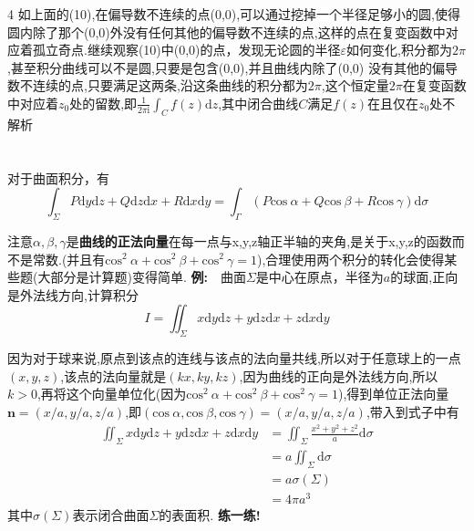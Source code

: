 \documentclass{ctexart}
\begin{document}
\textcircled{\footnotesize{4}} 如上面的(10),在偏导数不连续的点(0,0),可以通过挖掉一个半径足够小的圆,使得圆内除了那个(0,0)外没有任何其他的偏导数不连续的点,这样的点在复变函数中对应着孤立奇点.继续观察(10)中(0,0)的点，发现无论圆的半径$\varepsilon$如何变化,积分都为$2\pi$,甚至积分曲线可以不是圆,只要是包含(0,0),并且曲线内除了(0,0) 没有其他的偏导数不连续的点,只要满足这两条,沿这条曲线的积分都为$2\pi$,这个恒定量$2\pi$在复变函数中对应着$z_{0}$处的留数,即$\frac{1}{2\pi\mathrm{i}}\int_{C}f(z)\mathrm{d}z$,其中闭合曲线$C$满足$f(z)$在且仅在$z_{0}$处不解析

\section{}
对于曲面积分，有$$\int_{\Sigma}P\mathrm{d}y\mathrm{d}z+Q\mathrm{d}z\mathrm{d}x+R\mathrm{d}x\mathrm{d}y=\int_{\Gamma}(P\mathrm{cos}\ \alpha+Q\mathrm{cos}\ \beta+R\mathrm{cos}\ \gamma)\mathrm{d}\sigma$$

注意$\alpha,\beta,\gamma$是\textbf{曲线的正法向量}在每一点与x,y,z轴正半轴的夹角,是关于x,y,z的函数而不是常数.(并且有$\mathrm{cos}^{2}\ \alpha+\mathrm{cos}^{2}\ \beta+\mathrm{cos}^{2}\ \gamma=1$),合理使用两个积分的转化会使得某些题(大部分是计算题)变得简单.
\newline
\newline
\textbf{例:}\ \
曲面$\Sigma$是中心在原点，半径为$a$的球面,正向是外法线方向,计算积分$$I=\iint_{\Sigma}x\mathrm{d}y\mathrm{d}z+y\mathrm{d}z\mathrm{d}x+z\mathrm{d}x\mathrm{d}y$$

因为对于球来说,原点到该点的连线与该点的法向量共线,所以对于任意球上的一点$(x,y,z)$,该点的法向量就是$(kx,ky,kz)$,因为曲线的正向是外法线方向,所以$k>0$,再将这个向量单位化(因为$\mathrm{cos}^{2}\ \alpha+\mathrm{cos}^{2}\ \beta+\mathrm{cos}^{2}\ \gamma=1$),得到单位正法向量$\bm{n}=(x/a,y/a,z/a)$,即$(\mathrm{cos}\ \alpha,\mathrm{cos}\ \beta,\mathrm{cos}\ \gamma)=(x/a,y/a,z/a)$,带入到式子中有
\begin{align}
\iint_{\Sigma}x\mathrm{d}y\mathrm{d}z+y\mathrm{d}z\mathrm{d}x+z\mathrm{d}x\mathrm{d}y&=\iint_{\Sigma}\frac{x^{2}+y^{2}+z^{2}}{a}\mathrm{d}\sigma\nonumber\\
&=a\iint_{\Sigma}\mathrm{d}\sigma\nonumber\\
&=a\sigma (\Sigma)\nonumber\\
&=4\pi a^{3}\nonumber
\end{align}
其中$\sigma (\Sigma)$表示闭合曲面$\Sigma$的表面积.
\newline
\newline
\textbf{练一练!}
\end{document}
